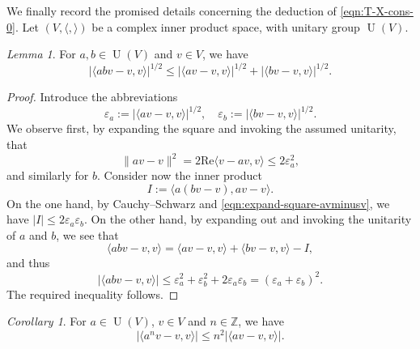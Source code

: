 \documentclass[reqno,10pt]{amsart}
\theoremstyle{plain} %
\theoremstyle{definition}
\theoremstyle{plain} %
\theoremstyle{remark}
\theoremstyle{itplain} %
\newtheorem*{lemma*}{Lemma}
\newtheorem*{corollary*} {Corollary}
\theoremstyle{remark} %
\renewcommand{\Re}{\mathrm{Re}}
\renewcommand{\leq}{\leqslant}
\numberwithin{equation}{section}
\def\eps{\varepsilon}
\DeclareMathOperator{\U}{U}
\begin{document}
We finally record the promised details concerning the deduction of \eqref{eqn:T-X-cons-0}.  Let $(V, \langle , \rangle)$ be a complex inner product space, with unitary group $\U(V)$.
\begin{lemma*}%
  For $a, b \in \U(V)$ and $v \in V$, we have
  \begin{equation*}
    \lvert \langle a b v - v, v \rangle \rvert^{1/2} \leq \lvert \langle a v - v, v \rangle \rvert^{1/2} + \lvert \langle b v - v, v \rangle \rvert ^{1/2}.
  \end{equation*}
\end{lemma*}
\begin{proof}
  Introduce the abbreviations
  \begin{equation*}
    \eps_a := \lvert \langle a v - v, v \rangle \rvert^{1/2},
    \quad 
    \eps_b := \lvert \langle b v - v, v \rangle \rvert^{1/2}.
  \end{equation*}
  We observe first, by expanding the square and invoking the assumed unitarity, that
  \begin{equation}\label{eqn:expand-square-avminusv}
    \lVert a v - v \rVert^2 = 2 \Re \langle v - a v, v \rangle \leq 2 \eps_a^2,
  \end{equation}
  and similarly for $b$.  Consider now the inner product
  \begin{equation*}
    I := \langle a (b v - v), a v - v \rangle.
  \end{equation*}
  On the one hand, by Cauchy--Schwarz and \eqref{eqn:expand-square-avminusv}, we have $|I| \leq 2 \eps_a \eps_b$.
  On the other hand, by expanding out and invoking the unitarity of $a$ and $b$, we see that
  \begin{equation*}
    \langle a b v - v, v \rangle =
    \langle a v - v , v \rangle
    +
    \langle b v - v, v \rangle
    - I,
  \end{equation*}
  and thus
  \begin{equation*}
    |\langle a b v - v, v \rangle| \leq \eps_a^2 + \eps_b^2 + 2 \eps_a \eps_b = (\eps_a + \eps_b)^2.
  \end{equation*}
  The required inequality follows.
\end{proof}
\begin{corollary*}%
  For $a \in \U(V)$, $v \in V$ and $n \in \mathbb{Z}$, we have
  \begin{equation}\label{eq:lvertlangle-an-v}
    \lvert\langle a^n v - v, v \rangle \rvert \leq n^2  \lvert \langle a v - v, v \rangle \rvert.
  \end{equation}
\end{corollary*}
\end{document}

